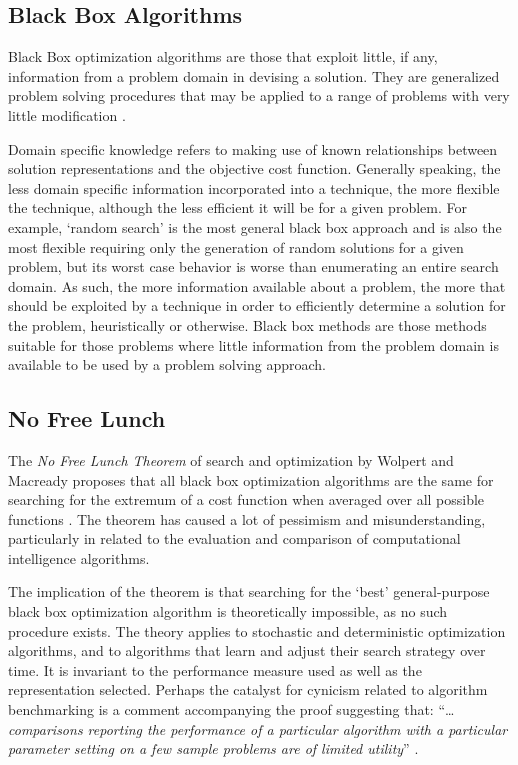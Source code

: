 \documentclass[a4paper, 11pt]{article}
\begin{document}
% 
% 
\subsection{Black Box Algorithms}
\label{subsec:black_box}
Black Box optimization algorithms are those that exploit little, if any, information from a problem domain in devising a solution. They are generalized problem solving procedures that may be applied to a range of problems with very little modification \cite{Droste2006}.

Domain specific knowledge refers to making use of known relationships between solution representations and the objective cost function. Generally speaking, the less domain specific information incorporated into a technique, the more flexible the technique, although the less efficient it will be for a given problem. For example, `random search' is the most general black box approach and is also the most flexible requiring only the generation of random solutions for a given problem, but its worst case behavior is worse than enumerating an entire search domain. As such, the more information available about a problem, the more that should be exploited by a technique in order to efficiently determine a solution for the problem, heuristically or otherwise. Black box methods are those methods suitable for those problems where little information from the problem domain is available to be used by a problem solving approach.  

% 
% 
\subsection{No Free Lunch}
\label{subsec:nfl}
The \emph{No Free Lunch Theorem} of search and optimization by Wolpert and Macready proposes that all black box optimization algorithms are the same for searching for the extremum of a cost function when averaged over all possible functions \cite{Wolpert1997, Wolpert1995}. The theorem has caused a lot of pessimism and misunderstanding, particularly in related to the evaluation and comparison of computational intelligence algorithms.

The implication of the theorem is that searching for the `best' general-purpose black box optimization algorithm is theoretically impossible, as no such procedure exists. The theory applies to stochastic and deterministic optimization algorithms, and to algorithms that learn and adjust their search strategy over time. It is invariant to the performance measure used as well as the representation selected. Perhaps the catalyst for cynicism related to algorithm benchmarking is a comment accompanying the proof suggesting that: ``\ldots \emph{comparisons reporting the performance of a particular algorithm with a particular parameter setting on a few sample problems are of limited utility}'' \cite{Wolpert1997}.
\end{document}
